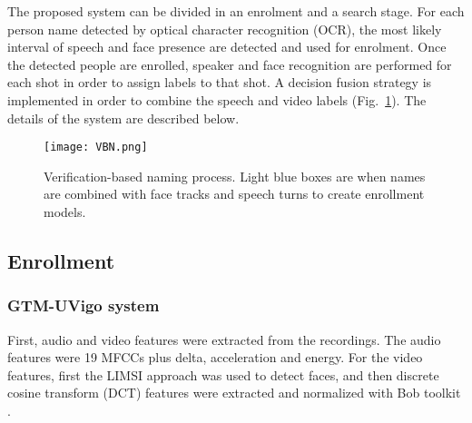 The proposed system can be divided in an enrolment and a search stage. For each person name detected by optical character recognition (OCR), the most likely interval
of speech and face presence are detected and used for enrolment.
Once the detected people are enrolled, speaker and face recognition
are performed for each shot in order to assign labels to that shot. 
A decision fusion strategy is implemented in order to combine the speech and video labels (Fig.~\ref{fig:vbn}). The details of the system
are described below.

\begin{figure}[!htb]
 \centering
 \texttt{[image: VBN.png]}
\vspace*{-5mm}
 \caption{Verification-based naming process. Light blue boxes are when names are combined with face tracks and speech turns to create enrollment models.}
\vspace*{-5mm}
 \label{fig:vbn}
\end{figure}

\subsection{Enrollment}

\subsubsection{GTM-UVigo system}
First, audio and video features were extracted from the recordings. The audio features were 19 MFCCs plus delta, acceleration and energy. For the video features, first
the LIMSI approach was used to detect faces, and then discrete cosine transform (DCT) features were extracted and normalized with Bob toolkit \cite{bob2012}.

